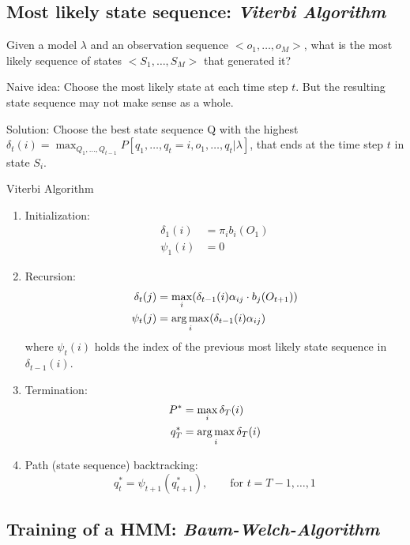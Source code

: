 \subsection*{Most likely state sequence: \emph{Viterbi Algorithm}}

Given a model \(\lambda\) and an observation sequence \(<o_1,\dots, o_M>\), what is the most likely sequence of states \(<S_1,\dots, S_M>\) that generated it?

Naive idea: Choose the most likely state at each time step $t$. But the resulting state sequence may not make sense as a whole.

Solution: Choose the best state sequence Q with the highest $\delta_t(i) = \max_{Q_1, \ldots, Q_{t-1}} P[q_1, \ldots, q_t=i, o_1, \ldots, q_t | \lambda]$, that ends at the time step $t$ in state $S_i$.

\begin{algorithm}[H]
\caption{Viterbi Algorithm}
\begin{enumerate}
    \item Initialization:
        \begin{align*}
            \delta_1(i) &= \pi_i b_i(O_1)\\
            \psi_1(i) &= 0
        \end{align*}
    \item Recursion:
        \begin{align*}
            \delta_t(j) &= \max_i (\delta_{t-1}(i) \alpha_{ij} \cdot b_j(O_{t+1}))\\
            \psi_t(j) &= \operatorname*{arg\,max}_i (\delta_{t-1}(i) \alpha_{ij})
        \end{align*}
				where $\psi_t(i)$ holds the index of the previous most likely state sequence in $\delta_{t-1}(i)$.
    \item Termination:
        \begin{align*}
            P^* &= \max_i \delta_T(i)\\
            q_T^* &= \operatorname*{arg\,max}_i \delta_T(i)
        \end{align*}
    \item Path (state sequence) backtracking:
        \[q_t^* = \psi_{t+1}(q_{t+1}^*), \qquad \text{for } t = T-1, \dots, 1\]
\end{enumerate}
\end{algorithm}

\subsection{Training of a HMM: \emph{Baum-Welch-Algorithm}}

